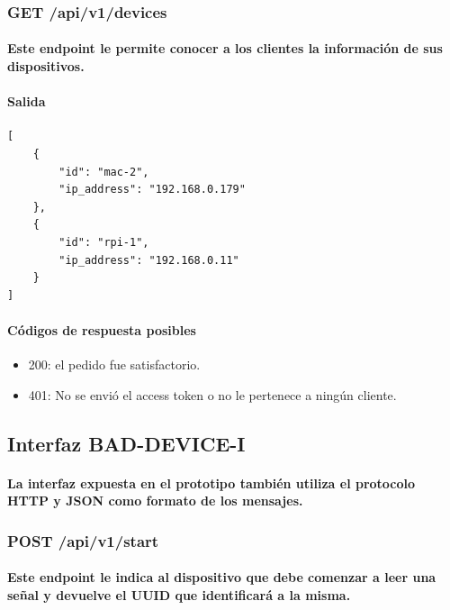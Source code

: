 \documentclass{article}
\begin{document}
\subsubsection{GET /api/v1/devices}
\paragraph{
Este endpoint le permite conocer a los clientes la información de sus dispositivos.
}
\paragraph{
\textbf{Salida}
}

\begin{verbatim}
[
    {
        "id": "mac-2",
        "ip_address": "192.168.0.179"
    },
    {
        "id": "rpi-1",
        "ip_address": "192.168.0.11"
    }
]

\end{verbatim}

\paragraph{
Códigos de respuesta posibles
}
\begin{itemize}
    \item 200: el pedido fue satisfactorio.
    \item 401: No se envió el access token o no le pertenece a ningún cliente.
\end{itemize}

\subsection{Interfaz BAD-DEVICE-I}
\paragraph{
La interfaz expuesta en el prototipo también utiliza el protocolo HTTP y JSON como formato de los mensajes.
}
\subsubsection{POST /api/v1/start}
\paragraph{
Este endpoint le indica al dispositivo que debe comenzar a leer una señal y devuelve el UUID que identificará a la misma.
}
\end{document}
